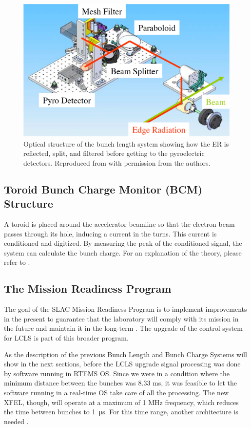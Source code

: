 \documentclass[letter,
        biblatex,   %
        keeplastbox,  %
        ]{jacow}
\begin{document}
\begin{figure}[!htb]
  \centering
  \includegraphics*[width=\columnwidth]{BunchLengthStruct_2}
  \caption{Optical structure of the bunch length system showing how the ER is reflected, split, and filtered before getting to the pyroelectric detectors. Reproduced from \cite{blen-pac07} with permission from the authors.}
  \label{fig:blen_struct2}
\end{figure}

\subsection{Toroid Bunch Charge Monitor (BCM) Structure}
A toroid is placed around the accelerator beamline so that the electron beam passes through its hole, inducing a current in the turns. This current is conditioned and digitized. By measuring the peak of the conditioned signal, the system can calculate the bunch charge. For an explanation of the theory, please refer to \cite{slac-pub-398}.

\subsection{The Mission Readiness Program}
The goal of the SLAC Mission Readiness Program is to implement improvements in the present to guarantee that the laboratory will comply with its mission in the future and maintain it in the long-term \cite{doe-MR}. The upgrade of the control system for LCLS is part of this broader program.

As the description of the previous Bunch Length and Bunch Charge Systems will show in the next sections, before the LCLS upgrade signal processing was done by software running in RTEMS OS. Since we were in a condition where the minimum distance between the bunches was 8.33 ms, it was feasible to let the software running in a real-time OS take care of all the processing. The new XFEL, though, will operate at a maximum of 1 MHz frequency, which reduces the time between bunches to \SI{1}{\micro\second}. For this time range, another architecture is needed \cite{timing-low-level-2012, rt-performance-2012}.
\end{document}
